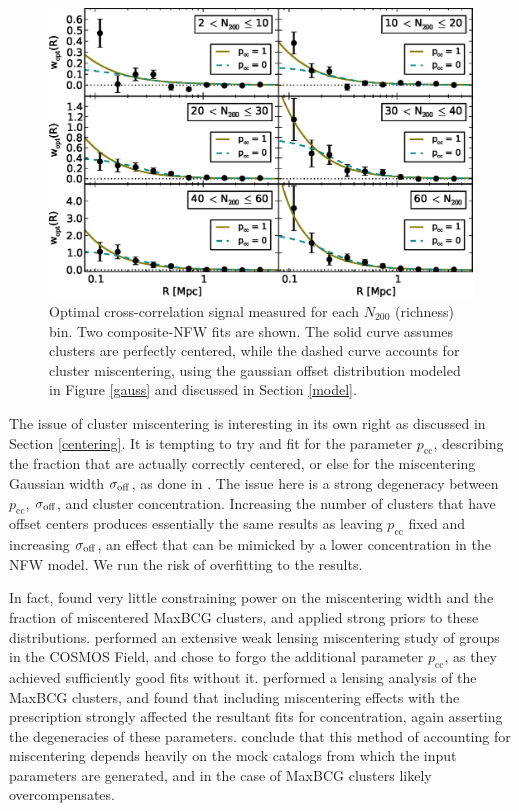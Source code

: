 \begin{figure}
\begin{center}
\includegraphics[scale=0.9]{plots_ch3/wopt_panel_fcc0and1_U.eps}
\caption[Magnification for Richness-Binned Clusters]{Optimal cross-correlation signal measured for each $N_{200}$ (richness) bin. Two composite-\ac{NFW} fits are shown. The solid curve assumes clusters are perfectly centered, while the dashed curve accounts for cluster miscentering, using the gaussian offset distribution modeled in Figure \ref{gauss} and discussed in Section \ref{model}.}
\label{binned}
\end{center}
\end{figure}

The issue of cluster miscentering is interesting in its own right as discussed in Section \ref{centering}. It is tempting to try and fit for the parameter $p_{\mathrm{cc}}$, describing the fraction that are actually correctly centered, or else for the miscentering Gaussian width $\sigma_{\rm{off}}$, as done in \citet{Johnston07}. The issue here is a strong degeneracy between $p_{\mathrm{cc}}$, $\sigma_{\rm{off}}$, and cluster concentration. Increasing the number of clusters that have offset centers produces essentially the same results as leaving $p_{\mathrm{cc}}$ fixed and increasing $\sigma_{\rm{off}}$, an effect that can be mimicked by a lower concentration in the \ac{NFW} model. We run the risk of overfitting to the results. 

In fact, \citet{Johnston07} found very little constraining power on the miscentering width and the fraction of miscentered MaxBCG clusters, and applied strong priors to these distributions. \citet{George12} performed an extensive weak lensing miscentering study of groups in the \ac{COSMOS} Field, and chose to forgo the additional parameter $p_{\mathrm{cc}}$, as they achieved sufficiently good fits without it. \citet{Mandelbaum08b} performed a lensing analysis of the MaxBCG clusters, and found that including miscentering effects with the \citet{Johnston07} prescription strongly affected the resultant fits for concentration, again asserting the degeneracies of these parameters. \citet{Mandelbaum08b} conclude that this method of accounting for miscentering depends heavily on the mock catalogs from which the input parameters are generated, and in the case of MaxBCG clusters likely overcompensates. 

